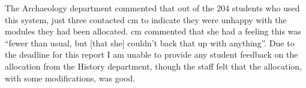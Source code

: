 The Archaeology department commented that out of the 204 students who used
this system, just three contacted \gls{cm} to indicate they were unhappy with
the modules they had been allocated. \gls{cm} commented that she had a feeling
this was ``fewer than usual, but [that she] couldn’t back that up with
anything''. Due to the deadline for this report I am unable to provide any
student feedback on the allocation from the History department, though the staff felt
that the allocation, with some modifications, was good.
